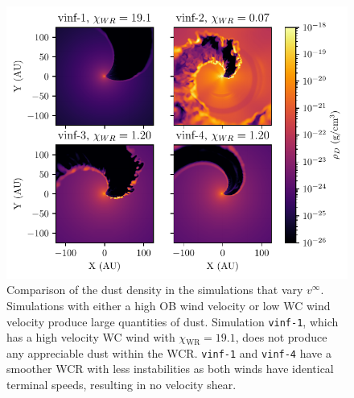 \documentclass[fleqn,usenatbib]{mnras}
\newcommand{\rms}[1]{\ensuremath{_{\text{#1}}}}
\begin{document}
\begin{figure}
  \centering
  \includegraphics[width=\linewidth]{assets/results/vinf/vinf-finished-rhod.pdf}
  \caption[Dust density comparison of terminal velocity varying systems]{Comparison of the dust density in the simulations that vary $v^\infty$. Simulations with either a high OB wind velocity or low WC wind velocity produce large quantities of dust. Simulation \texttt{vinf-1}, which has a high velocity WC wind with $\chi\rms{WR} = 19.1$, does not produce any appreciable dust within the WCR. \texttt{vinf-1} and \texttt{vinf-4} have a smoother WCR with less instabilities as both winds have identical terminal speeds, resulting in no velocity shear.}
  \label{fig:vinfrhodcomp}
\end{figure}
\end{document}
